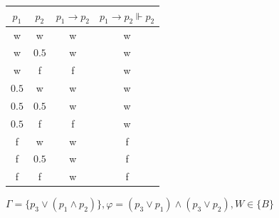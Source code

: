 \documentclass[10pt, a4paper]{exam}
\begin{document}
\begin{questions}
\begin{parts}
\begin{subparts}
\begin{solution}
                \begin{tabular}{c | c | c | c}
                    $p_1$ & $p_2$ & $p_1\rightarrow p_2$ & $p_1\rightarrow p_2\Vdash p_2$ \\\hline
                    w     & w     & w                    & w                              \\
                    w     & $0.5$ & w                    & w                              \\
                    w     & f     & f                    & w                              \\
                    $0.5$ & w     & w                    & w                              \\
                    $0.5$ & $0.5$ & w                    & w                              \\
                    $0.5$ & f     & f                    & w                              \\
                    f     & w     & w                    & f                              \\
                    f     & $0.5$ & w                    & f                              \\
                    f     & f     & w                    & f                              \\
                \end{tabular}
            \end{solution}

            \subpart $\Gamma=\{p_3\vee(p_1\wedge p_2)\}, \varphi=(p_3\vee p_1)\wedge(p_3\vee p_2), W\in\{B\}$
            \begin{solution}


\end{solution}
\end{subparts}
\end{parts}
\end{questions}
\end{document}
